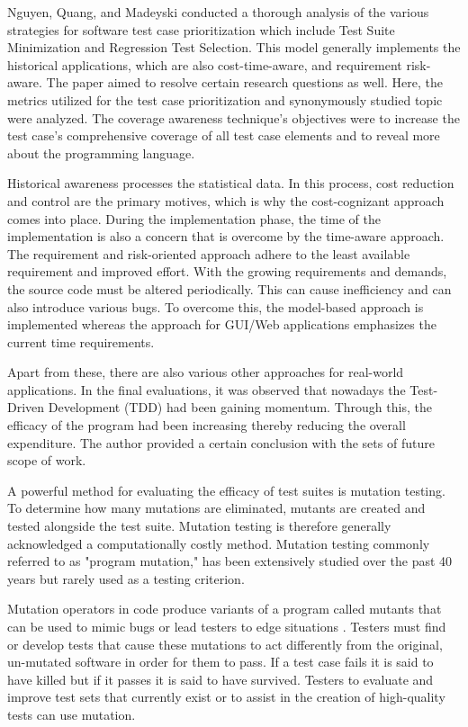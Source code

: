 Nguyen, Quang, and Madeyski \cite{ref29} conducted a thorough analysis of the various strategies for software test case prioritization which include Test Suite Minimization and Regression Test Selection. This model generally implements the historical applications, which are also cost-time-aware, and requirement risk-aware. The paper aimed to resolve certain research questions as well. Here, the metrics utilized for the test case prioritization and synonymously studied topic were analyzed. The coverage awareness technique's objectives were to increase the test case's comprehensive coverage of all test case elements and to reveal more about the programming language.\par 
Historical awareness processes the statistical data. In this process, cost reduction and control are the primary motives, which is why the cost-cognizant approach comes into place. During the implementation phase, the time of the implementation is also a concern that is overcome by the time-aware approach. The requirement and risk-oriented approach adhere to the least available requirement and improved effort. With the growing requirements and demands, the source code must be altered periodically. This can cause inefficiency and can also introduce various bugs. To overcome this, the model-based approach is implemented whereas the approach for GUI/Web applications emphasizes the current time requirements. \par 
Apart from these, there are also various other approaches for real-world applications. In the final evaluations, it was observed that nowadays the Test-Driven Development (TDD) had been gaining momentum. Through this, the efficacy of the program had been increasing thereby reducing the overall expenditure. The author provided a certain conclusion with the sets of future scope of work.\par 
A powerful method for evaluating the efficacy of test suites is mutation testing. To determine how many mutations are eliminated, mutants are created and tested alongside the test suite. Mutation testing is therefore generally acknowledged a computationally costly method. Mutation testing commonly referred to as "program mutation," has been extensively studied over the past 40 years but rarely used as a testing criterion.\par 
Mutation operators in code produce variants of a program called mutants that can be used to mimic bugs or lead testers to edge situations \cite{ref30}. Testers must find or develop tests that cause these mutations to act differently from the original, un-mutated software in order for them to pass. If a test case fails it is said to have killed but if it passes it is said to have survived. Testers to evaluate and improve test sets that currently exist or to assist in the creation of high-quality tests can use mutation.\par 
